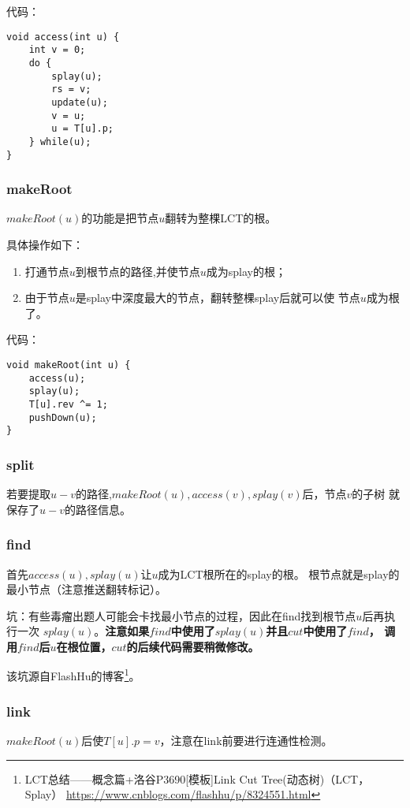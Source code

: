 代码：
\begin{lstlisting}[title=access]
void access(int u) {
    int v = 0;
    do {
        splay(u);
        rs = v;
        update(u);
        v = u;
        u = T[u].p;
    } while(u);
}
\end{lstlisting}

\subsubsection{makeRoot}
$makeRoot(u)$的功能是把节点$u$翻转为整棵LCT的根。

具体操作如下：

\begin{enumerate}
    \item 打通节点$u$到根节点的路径,并使节点$u$成为splay的根；
    \item 由于节点$u$是splay中深度最大的节点，翻转整棵splay后就可以使
    节点$u$成为根了。
\end{enumerate}

代码：

\begin{lstlisting}[title=makeRoot]
void makeRoot(int u) {
    access(u);
    splay(u);
    T[u].rev ^= 1;
    pushDown(u);
}
\end{lstlisting}
\subsubsection{split}
若要提取$u-v$的路径,$makeRoot(u),access(v),splay(v)$后，节点$v$的子树
就保存了$u-v$的路径信息。
\subsubsection{find}\label{LCTFind}
首先$access(u),splay(u)$让$u$成为LCT根所在的splay的根。
根节点就是splay的最小节点（注意推送翻转标记）。

坑：有些毒瘤出题人可能会卡找最小节点的过程，因此在find找到根节点$u$后再执行一次
$splay(u)$。{\bfseries 注意如果$find$中使用了$splay(u)$并且$cut$中使用了$find$，
调用$find$后$u$在根位置，$cut$的后续代码需要稍微修改。}

该坑源自FlashHu的博客\footnote{
    LCT总结——概念篇+洛谷P3690[模板]Link Cut Tree(动态树)（LCT，Splay）
    \url{https://www.cnblogs.com/flashhu/p/8324551.html}
}。
\subsubsection{link}
$makeRoot(u)$后使$T[u].p=v$，注意在link前要进行连通性检测。
